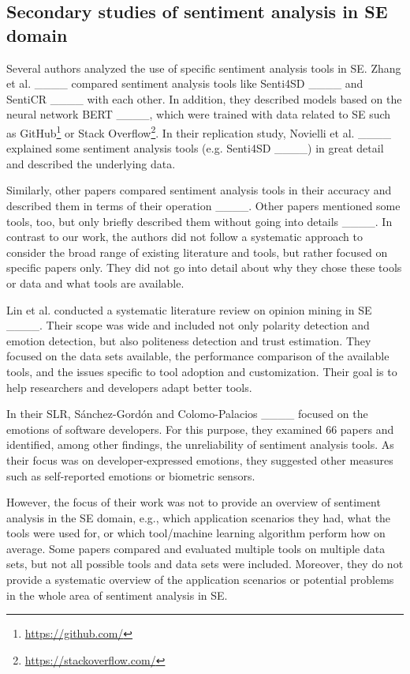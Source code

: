 \subsection{Secondary studies of sentiment analysis in SE domain}

Several authors analyzed the use of specific sentiment analysis tools in SE.
Zhang et al. ____ compared sentiment analysis tools like Senti4SD ____ and SentiCR ____ with each other. In addition, they described models based on the neural network BERT ____, which were trained with data related to SE such as GitHub\footnote{\url{https://github.com/}} or Stack Overflow\footnote{\url{https://stackoverflow.com/}}. In their replication study, Novielli et al. ____ explained some sentiment analysis tools (e.g. Senti4SD ____) in great detail and described the underlying data.

Similarly, other papers compared sentiment analysis tools in their accuracy and described them in terms of their operation ____. Other papers mentioned some tools, too, but only briefly described them without going into details ____.
In contrast to our work, the authors did not follow a systematic approach to consider the broad range of existing literature and tools, but rather focused on specific papers only. They did not go into detail about why they chose these tools or data and what tools are available.

Lin et al. conducted a systematic literature review on opinion mining in SE ____. Their scope was wide and included not only polarity detection and emotion detection, but also politeness detection and trust estimation. They focused on the data sets available, the performance comparison of the available tools, and the issues specific to tool adoption and customization. Their goal is to help researchers and developers adapt better tools.

In their SLR, Sánchez-Gordón and Colomo-Palacios ____ focused on the emotions of software developers. For this purpose, they examined 66 papers and identified, among other findings, the unreliability of sentiment analysis tools. As their focus was on developer-expressed emotions, they suggested other measures such as self-reported emotions or biometric sensors.

However, the focus of their work was not to provide an overview of sentiment analysis in the SE domain, e.g., which application scenarios they had, what the tools were used for, or which tool/machine learning algorithm perform how on average. Some papers compared and evaluated multiple tools on multiple data sets, but not all possible tools and data sets were included. Moreover, they do not provide a systematic overview of the application scenarios or potential problems in the whole area of sentiment analysis in SE.